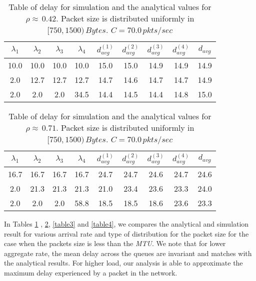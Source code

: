 \documentclass[10pt, conference, compsocconf]{IEEEtran}
\begin{document}
\begin{table}[!h]
\caption{Table of delay for simulation and the analytical values for $\rho \approx \, 0.42$. Packet size is distributed uniformly in $[750, 1500) \, Bytes$. $C = 70.0\, pkts/sec$ }
\begin{center}
\begin{tabular}{|c|c|c|c|c|c|c|c|c|}
\hline $\lambda_1 $ & $\lambda_2$ & $\lambda_3$ & $\lambda_4$ & $d^{(1)}_{avg}$ & $d^{(2)}_{avg}$ & $d^{(3)}_{avg}$ & $d^{(4)}_{avg}$ & $d_{avg}$  \\ 
\hline 10.0 & 10.0 & 10.0 & 10.0 & 15.0 & 15.0 & 14.9 & 14.9 & 14.9 \\ 
\hline 2.0 & 12.7 & 12.7 & 12.7 & 14.7 & 14.6 & 14.7 & 14.7 & 14.9 \\ 
\hline 2.0 & 2.0 & 2.0 & 34.5 & 14.4 & 14.5 & 14.4 & 14.8 &  15.0\\ 
\hline
\end{tabular} 
\end{center}
\label{table1}
\end{table}

\begin{table}[!h]
\caption{Table of delay for simulation and the analytical values for $\rho \approx \, 0.71$. Packet size is distributed uniformly in $[750, 1500) \, Bytes$. $C = 70.0\, pkts/sec$ }
\begin{center}
\begin{tabular}{|c|c|c|c|c|c|c|c|c|}
\hline $\lambda_1 $ & $\lambda_2$ & $\lambda_3$ & $\lambda_4$ & $d^{(1)}_{avg}$ & $d^{(2)}_{avg}$ & $d^{(3)}_{avg}$ & $d^{(4)}_{avg}$ & $d_{avg}$  \\ 
\hline 16.7 & 16.7 & 16.7 & 16.7 & 24.7 & 24.7 & 24.6 & 24.7 & 24.6 \\ 
\hline  2.0 & 21.3 & 21.3 & 21.3 & 21.0 & 23.4 & 23.6 & 23.3 & 24.0 \\ 
\hline  2.0 & 2.0 & 2.0 & 58.8 & 18.5 & 18.5 & 18.6 & 23.6 & 23.3 \\ 
\hline 
\end{tabular} 
\end{center}
\label{table2}
\end{table}

In Tables \ref{table1} , \ref{table2}, \ref{table3} and \ref{table4}, we compares the analytical and simulation result for various arrival rate and type of distribution for the packet size for the case when the packets size is less than the \textit{MTU}. We note that for lower aggregate rate, the mean delay across the queues are invariant and matches with the analytical results. For higher load, our analysis is able to approximate the maximum delay experienced by a packet in the network.
\end{document}
